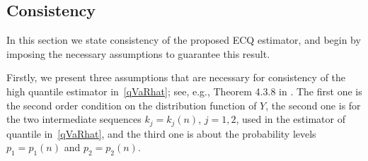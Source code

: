 \documentclass[11pt,letterpaper]{article}
\numberwithin{equation}{section}
\begin{document}
\subsection{Consistency}\label{ss:consist}


In this section we state consistency of the proposed ECQ estimator, and begin by imposing the necessary assumptions to guarantee this result.

Firstly, we present three assumptions that are necessary for consistency of the high quantile estimator in~\eqref{qVaRhat}; see, e.g., Theorem 4.3.8 in \cite{dHF2006}. The first one is the second order condition on the distribution function of $Y$, the second one is for the two intermediate sequences $k_j = k_j(n)$, $j = 1,2$, used in the estimator of quantile in~\eqref{qVaRhat}, and the third one is about the probability levels $p_1 = p_1(n)$ and $p_2 = p_2(n)$.
\end{document}

